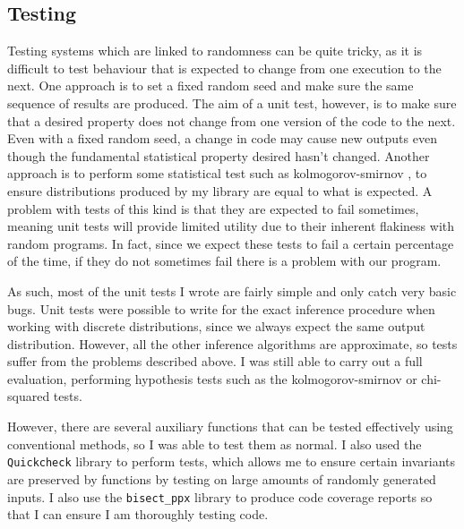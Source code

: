 \subsection{Testing} \label{sec:prep-testing}

Testing systems which are linked to randomness can be quite tricky, as it is difficult to test behaviour that is expected to change from one execution to the next. One approach is to set a fixed random seed and make sure the same sequence of results are produced. The aim of a unit test, however, is to make sure that a desired property does not change from one version of the code to the next. Even with a fixed random seed, a change in code may cause new outputs even though the fundamental statistical property desired hasn't changed. Another approach is to perform some statistical test such as kolmogorov-smirnov \cite{massey1951kolmogorov}, to ensure distributions produced by my library are equal to what is expected. A problem with tests of this kind is that they are expected to fail sometimes, meaning unit tests will provide limited utility due to their inherent flakiness with random programs. In fact, since we expect these tests to fail a certain percentage of the time, if they do not sometimes fail there is a problem with our program.

As such, most of the unit tests I wrote are fairly simple and only catch very basic bugs. Unit tests were possible to write for the exact inference procedure when working with discrete distributions, since we always expect the same output distribution. However, all the other inference algorithms are approximate, so tests suffer from the problems described above. I was still able to carry out a full evaluation, performing hypothesis tests such as the kolmogorov-smirnov or chi-squared tests.

However, there are several auxiliary functions that can be tested effectively using conventional methods, so I was able to test them as normal. I also used the \texttt{Quickcheck} library to perform tests, which allows me to ensure certain invariants are preserved by functions by testing on large amounts of randomly generated inputs. I also use the \texttt{bisect\_ppx} library to produce code coverage reports so that I can ensure I am thoroughly testing code.


